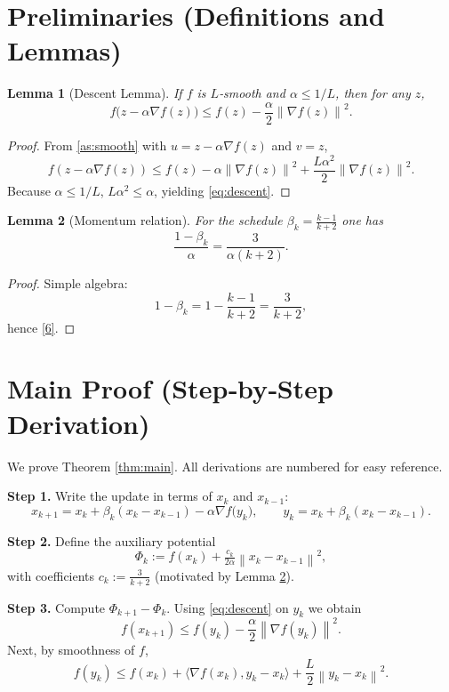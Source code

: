 \documentclass{article}
\newtheorem{lemma}{Lemma}
\newcommand{\norm}[1]{\left\|#1\right\|}
\newcommand{\inner}[2]{\langle #1,#2\rangle}
\begin{document}
\section*{Preliminaries (Definitions and Lemmas)}
\begin{lemma}[Descent Lemma]\label{lem:descent}
If $f$ is $L$‑smooth and $\alpha\le 1/L$, then for any $z$,
\[
f\bigl(z-\alpha\nabla f(z)\bigr)\le f(z)-\frac{\alpha}{2}\norm{\nabla f(z)}^{2}.
\tag{5}
\]
\end{lemma}
\begin{proof}
From \eqref{as:smooth} with $u=z-\alpha\nabla f(z)$ and $v=z$,
\[
f(z-\alpha\nabla f(z))\le f(z)-\alpha\norm{\nabla f(z)}^{2}
+\frac{L\alpha^{2}}{2}\norm{\nabla f(z)}^{2}.
\]
Because $\alpha\le1/L$, $L\alpha^{2}\le\alpha$, yielding \eqref{eq:descent}.
\end{proof}

\begin{lemma}[Momentum relation]\label{lem:beta}
For the schedule $\beta_{k}=\frac{k-1}{k+2}$ one has
\[
\frac{1-\beta_{k}}{\alpha}
=
\frac{3}{\alpha(k+2)}.
\tag{6}
\]
\end{lemma}
\begin{proof}
Simple algebra:
\[
1-\beta_{k}=1-\frac{k-1}{k+2}=\frac{3}{k+2},
\]
hence \eqref{6}.
\end{proof}

\section*{Main Proof (Step‑by‑Step Derivation)}
We prove Theorem \ref{thm:main}. All derivations are numbered for easy reference.

\noindent\textbf{Step 1.}  Write the update in terms of $x_{k}$ and $x_{k-1}$:
\[
x_{k+1}=x_{k}+\beta_{k}(x_{k}-x_{k-1})-\alpha\nabla f\!\bigl(y_{k}\bigr),
\qquad y_{k}=x_{k}+\beta_{k}(x_{k}-x_{k-1}).
\tag{7}
\]

\noindent\textbf{Step 2.}  Define the auxiliary potential
\[
\Phi_{k}:=f(x_{k})+\tfrac{c_{k}}{2\alpha}\norm{x_{k}-x_{k-1}}^{2},
\tag{8}
\]
with coefficients $c_{k}:= \frac{3}{k+2}$ (motivated by Lemma \ref{lem:beta}).

\noindent\textbf{Step 3.}  Compute $\Phi_{k+1}-\Phi_{k}$.
Using \eqref{eq:descent} on $y_{k}$ we obtain
\[
f(x_{k+1})\le f(y_{k})-\frac{\alpha}{2}\norm{\nabla f(y_{k})}^{2}.
\tag{9}
\]
Next, by smoothness of $f$,
\[
f(y_{k})\le f(x_{k})+\inner{\nabla f(x_{k})}{y_{k}-x_{k}}
+\frac{L}{2}\norm{y_{k}-x_{k}}^{2}.
\tag{10}
\]
\end{document}
